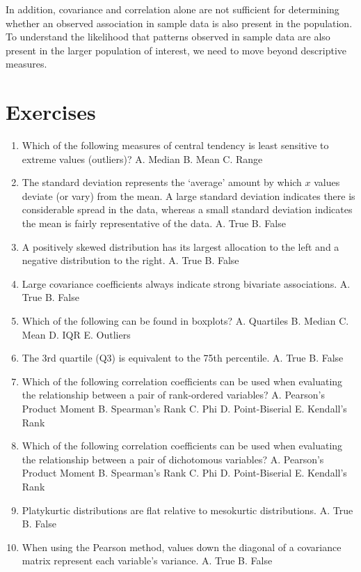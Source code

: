 \documentclass[]{book}
\begin{document}
In addition, covariance and correlation alone are not sufficient for determining whether an observed association in sample data is also present in the population. To understand the likelihood that patterns observed in sample data are also present in the larger population of interest, we need to move beyond descriptive measures.

\hypertarget{exercises-1}{%
\section{Exercises}\label{exercises-1}}

\begin{enumerate}
\def\labelenumi{\arabic{enumi}.}
\item
  Which of the following measures of central tendency is least sensitive to extreme values (outliers)?
  A. Median
  B. Mean
  C. Range
\item
  The standard deviation represents the `average' amount by which \(x\) values deviate (or vary) from the mean. A large standard deviation indicates there is considerable spread in the data, whereas a small standard deviation indicates the mean is fairly representative of the data.
  A. True
  B. False
\item
  A positively skewed distribution has its largest allocation to the left and a negative distribution to the right.
  A. True
  B. False
\item
  Large covariance coefficients always indicate strong bivariate associations.
  A. True
  B. False
\item
  Which of the following can be found in boxplots?
  A. Quartiles
  B. Median
  C. Mean
  D. IQR
  E. Outliers
\item
  The 3rd quartile (Q3) is equivalent to the 75th percentile.
  A. True
  B. False
\item
  Which of the following correlation coefficients can be used when evaluating the relationship between a pair of rank-ordered variables?
  A. Pearson's Product Moment
  B. Spearman's Rank
  C. Phi
  D. Point-Biserial
  E. Kendall's Rank
\item
  Which of the following correlation coefficients can be used when evaluating the relationship between a pair of dichotomous variables?
  A. Pearson's Product Moment
  B. Spearman's Rank
  C. Phi
  D. Point-Biserial
  E. Kendall's Rank
\item
  Platykurtic distributions are flat relative to mesokurtic distributions.
  A. True
  B. False
\item
  When using the Pearson method, values down the diagonal of a covariance matrix represent each variable's variance.
  A. True
  B. False
\end{enumerate}
\end{document}
